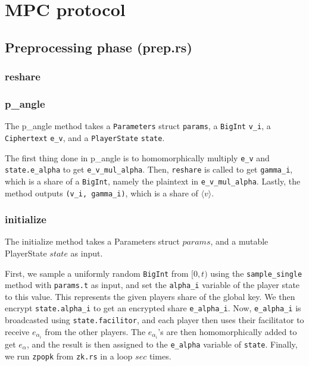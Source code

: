 \documentclass{article}
\begin{document}
\section{MPC protocol}

\subsection{Preprocessing phase (prep.rs)}
\subsubsection{reshare}

\subsubsection{p\_angle}
The p\_angle method takes a \lstinline{Parameters} struct \lstinline{params}, a \lstinline{BigInt} \lstinline{v_i}, a \lstinline{Ciphertext} \lstinline{e_v}, and a \lstinline{PlayerState} \lstinline{state}.

The first thing done in p\_angle is to homomorphically multiply \lstinline{e_v} and \lstinline{state.e_alpha} to get \lstinline{e_v_mul_alpha}. Then, \lstinline{reshare} is called to get \lstinline{gamma_i}, which is a share of a \lstinline{BigInt}, namely the plaintext in \lstinline{e_v_mul_alpha}. Lastly, the method outputs \lstinline{(v_i, gamma_i)}, which is a share of $\langle v \rangle$.
 
\subsubsection{initialize}
The initialize method takes a Parameters struct $params$, and a mutable PlayerState $state$ as input.

First, we sample a uniformly random \lstinline{BigInt} from $[0, t)$ using the \lstinline{sample_single} method with \lstinline{params.t} as input, and set the \lstinline{alpha_i} variable of the player state to this value. This represents the given players share of the global key. We then encrypt \lstinline{state.alpha_i} to get an encrypted share \lstinline{e_alpha_i}. Now, \lstinline{e_alpha_i} is broadcasted using \lstinline{state.facilitor}, and each player then uses their facilitator to receive $e_{\alpha_i}$ from the other players. The $e_{\alpha_i}$'s are then homomorphically added to get $e_\alpha$, and the result is then assigned to the \lstinline{e_alpha} variable of \lstinline{state}. %
Finally, we run \lstinline{zpopk} from \lstinline{zk.rs} in a loop $sec$ times.
\end{document}
